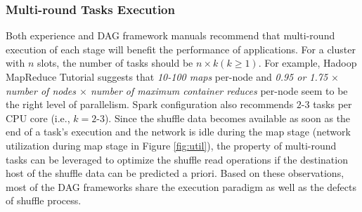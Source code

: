 \subsubsection{Multi-round Tasks Execution}\label{multi}
\ifrevision
{}
\fi
Both experience and DAG framework manuals recommend that multi-round execution of each stage will benefit the performance of applications.
For a cluster with $n$ slots, the number of tasks should be $n \times k (k \geq 1)$. 
For example, Hadoop MapReduce Tutorial \cite{hadooptutorial} suggests that \textit{10-100 maps} per-node and \textit{0.95 or 1.75 $\times$ number of nodes $\times$ number of maximum container reduces} per-node seem to be the right level of parallelism. 
Spark configuration also recommends $2\text{-}3$ tasks per CPU core \cite{sparkconf} (i.e., $k = 2\text{-}3$).
Since the shuffle data becomes available as soon as the end of a task's execution 
and the network is idle during the map stage (network utilization during map stage in Figure \ref{fig:util}), 
the property of multi-round tasks can be leveraged to optimize the shuffle read operations if the destination host of the shuffle data can be predicted a priori. 
\ifrevision
{}
\fi
Based on these observations, most of the DAG frameworks share the execution paradigm as well as the defects of shuffle process. 

